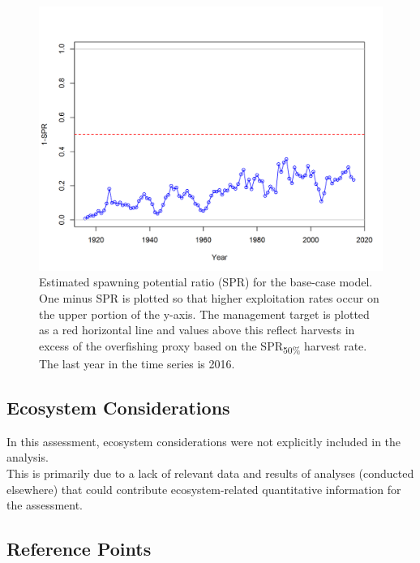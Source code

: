 \documentclass[12pt,]{article}
\begin{document}
\FloatBarrier

\begin{figure}[htbp]
\centering
\includegraphics{r4ss/plots_mod1/SPR2_minusSPRseries.png}
\caption{Estimated spawning potential ratio (SPR) for the base-case
model. One minus SPR is plotted so that higher exploitation rates occur
on the upper portion of the y-axis. The management target is plotted as
a red horizontal line and values above this reflect harvests in excess
of the overfishing proxy based on the SPR\textsubscript{50\%} harvest
rate. The last year in the time series is 2016. \label{fig:SPR_all}}
\end{figure}

\FloatBarrier

\subsection*{Ecosystem Considerations}\label{ecosystem-considerations}

In this assessment, ecosystem considerations were not explicitly
included in the analysis.\\
This is primarily due to a lack of relevant data and results of analyses
(conducted elsewhere) that could contribute ecosystem-related
quantitative information for the assessment.

\subsection*{Reference Points}\label{reference-points}
\end{document}
